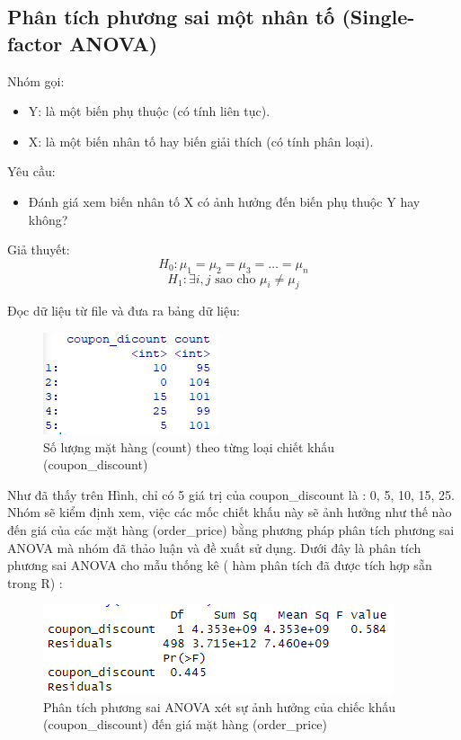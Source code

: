 \subsection{Phân tích phương sai một nhân tố (Single-factor ANOVA)}

Nhóm gọi:
\begin{itemize}
    \item Y: là một biến phụ thuộc (có tính liên tục).
    \item X: là một biến nhân tố hay biến giải thích (có tính phân loại).
\end{itemize}

Yêu cầu:
\begin{itemize}
    \item Đánh giá xem biến nhân tố X có ảnh hưởng đến biến phụ thuộc Y hay không?
\end{itemize}
Giả thuyết:
  \[
  H_{0}: \mu_{1} = \mu_{2} = \mu_{3} = \dots = \mu_{n}
  \]
  \[
  H_{1}: \exists i, j \text{ sao cho } \mu_{i} \neq \mu_{j}
  \]

Đọc dữ liệu từ file và đưa ra bảng dữ liệu:

\begin{figure}[!htbp]
    \centering
    \includegraphics[width=0.4\linewidth]{graphics/5.3.1.png}
    \caption{Số lượng mặt hàng (count) theo từng loại chiết khấu (coupon\_discount)}
\end{figure}

Như đã thấy trên Hình, chỉ có 5 giá trị của coupon\_discount là : 0, 5, 10, 15, 25. Nhóm sẽ kiểm định xem, việc các mốc chiết khấu này sẽ ảnh hưởng như thế nào đến giá của các mặt hàng (order\_price) bằng phương pháp phân tích phương sai ANOVA mà nhóm đã thảo luận và đề xuất sử dụng. Dưới đây là phân tích phương sai ANOVA cho mẫu thống kê ( hàm phân tích đã được tích hợp sẵn trong R) :

\begin{figure}[!htbp]
    \centering
    \includegraphics[width=0.4\linewidth]{graphics/5.3.2.png}
    \caption{Phân tích phương sai ANOVA xét sự ảnh hưởng của chiếc khấu (coupon\_discount) đến giá mặt hàng (order\_price)}
\end{figure}

